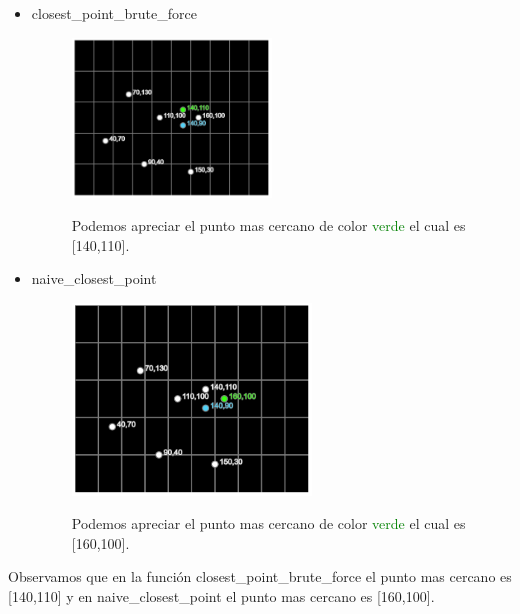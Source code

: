 \begin{itemize}
    \item closest\_point\_brute\_force
    \begin{figure}[H]
     \centering
     \includegraphics[width=0.5\textwidth]{images/prueba2_brute_force.PNG}
     \label{fig:act-6-1}
     \caption{Podemos apreciar el punto mas cercano de color \textcolor{green}{verde} el cual es [140,110].}
    \end{figure}
    \item naive\_closest\_point
    \begin{figure}[H]
     \centering
     \includegraphics[width=0.6\textwidth]{images/prueba2_naive.PNG}
     \label{fig:act-6-2}
     \caption{Podemos apreciar el punto mas cercano de color \textcolor{green}{verde} el cual es [160,100].}
    \end{figure}
\end{itemize}

Observamos que en la función closest\_point\_brute\_force el punto mas cercano es [140,110] y en naive\_closest\_point el punto mas cercano es [160,100].


